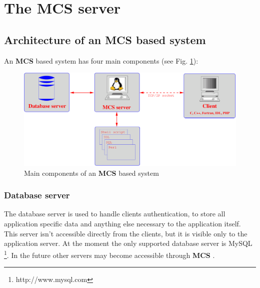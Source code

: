 \documentclass[12pt,titlepage]{article}
\newcommand{\mcs}{\textbf{MCS} }
\begin{document}
%
%
%
%
%

%
\newpage
\section{The \mcs server}

\subsection{Architecture of an \mcs based system}
\label{sec:architecture}
An \mcs based system has four main components (see
Fig. \ref{fig:maincomponents}):

%
\begin{figure}[hbtp]
\begin{center}
\includegraphics[width=14cm,keepaspectratio]{includes/diaggen}
\end{center}
\caption{Main components of an \mcs based system}
\label{fig:maincomponents}
\end{figure}
%

\subsubsection{Database server}
The database server is used to handle clients authentication, to store
all application specific data and anything else necessary to the
application itself. This server isn't accessible directly from the
clients, but it is visible only to the application server. At the moment
the only supported database server is MySQL \footnote{http://www.mysql.com}.
In the future other servers may become accessible through \mcs.
\end{document}
